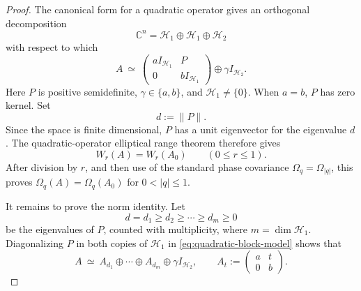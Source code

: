 \documentclass[11pt]{article}
\theoremstyle{remark}
\begin{document}
\begin{proof}
The canonical form for a quadratic operator
\cite[Theorem~1.1]{LiPoonSze2011} gives an orthogonal decomposition
\[
  \mathbb C^n=\mathcal H_1\oplus\mathcal H_1\oplus\mathcal H_2
\]
with respect to which
\begin{equation}
\label{eq:quadratic-block-model}
  A\ \simeq\
  \begin{pmatrix}
    aI_{\mathcal H_1}&P\\
    0&bI_{\mathcal H_1}
  \end{pmatrix}
  \oplus \gamma I_{\mathcal H_2}.
\end{equation}
Here \(P\) is positive semidefinite, \(\gamma\in\{a,b\}\), and
\(\mathcal H_1\neq\{0\}\).  When \(a=b\), \(P\) has zero kernel.  Set
\[
  d:=\|P\|.
\]
Since the space is finite dimensional, \(P\) has a unit eigenvector
for the eigenvalue \(d\).  The quadratic-operator elliptical range
theorem
\cite[Theorem~3.1 and Corollary~3.3]{LiPoonSze2011} therefore gives
\[
  W_r(A)=W_r(A_0)
  \qquad(0\leq r\leq1).
\]
After division by \(r\), and then use of the standard phase covariance
\(\Omega_q=\Omega_{|q|}\), this proves
\(\Omega_q(A)=\Omega_q(A_0)\) for \(0<|q|\leq1\).

It remains to prove the norm identity.  Let
\[
  d=d_1\geq d_2\geq\cdots\geq d_m\geq0
\]
be the eigenvalues of \(P\), counted with multiplicity, where
\(m=\dim\mathcal H_1\).  Diagonalizing \(P\) in both copies of
\(\mathcal H_1\) in \eqref{eq:quadratic-block-model} shows that
\begin{equation}
\label{eq:quadratic-direct-sum}
  A\ \simeq\
  A_{d_1}\oplus\cdots\oplus A_{d_m}
  \oplus\gamma I_{\mathcal H_2},
  \qquad
  A_t:=
  \begin{pmatrix}
    a&t\\
    0&b
  \end{pmatrix}.
\end{equation}


\end{proof}
\end{document}
